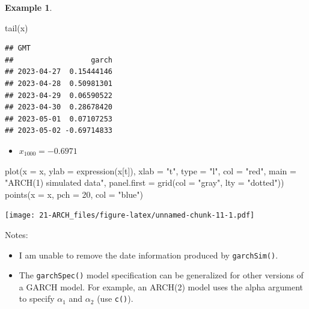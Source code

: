 \documentclass[
]{book}
\newenvironment{Shaded}{\begin{snugshade}}{\end{snugshade}}
\newcommand{\AttributeTok}[1]{\textcolor[rgb]{0.77,0.63,0.00}{#1}}
\newcommand{\DecValTok}[1]{\textcolor[rgb]{0.00,0.00,0.81}{#1}}
\newcommand{\FunctionTok}[1]{\textcolor[rgb]{0.00,0.00,0.00}{#1}}
\newcommand{\NormalTok}[1]{#1}
\newcommand{\StringTok}[1]{\textcolor[rgb]{0.31,0.60,0.02}{#1}}
\providecommand{\tightlist}{%
  \setlength{\itemsep}{0pt}\setlength{\parskip}{0pt}}
\theoremstyle{definition}
\theoremstyle{definition}
\newtheorem{example}{Example}[chapter]
\theoremstyle{definition}
\theoremstyle{definition}
\theoremstyle{remark}
\begin{document}
\begin{example}
\begin{Shaded}
\begin{Highlighting}[]
\FunctionTok{tail}\NormalTok{(x)}
\end{Highlighting}
\end{Shaded}

\begin{verbatim}
## GMT
##                  garch
## 2023-04-27  0.15444146
## 2023-04-28  0.50981301
## 2023-04-29  0.06590522
## 2023-04-30  0.28678420
## 2023-05-01  0.07107253
## 2023-05-02 -0.69714833
\end{verbatim}

\begin{itemize}
\tightlist
\item
  \(x_{1000}=-0.6971\)
\end{itemize}

\begin{Shaded}
\begin{Highlighting}[]
\FunctionTok{plot}\NormalTok{(}\AttributeTok{x =}\NormalTok{ x, }\AttributeTok{ylab =} \FunctionTok{expression}\NormalTok{(x[t]), }\AttributeTok{xlab =} \StringTok{"t"}\NormalTok{, }\AttributeTok{type =} 
    \StringTok{"l"}\NormalTok{, }\AttributeTok{col =} \StringTok{"red"}\NormalTok{, }\AttributeTok{main =} \StringTok{"ARCH(1) simulated data"}\NormalTok{, }
    \AttributeTok{panel.first =} \FunctionTok{grid}\NormalTok{(}\AttributeTok{col =} \StringTok{"gray"}\NormalTok{, }\AttributeTok{lty =} \StringTok{"dotted"}\NormalTok{))}
\FunctionTok{points}\NormalTok{(}\AttributeTok{x =}\NormalTok{ x, }\AttributeTok{pch =} \DecValTok{20}\NormalTok{, }\AttributeTok{col =} \StringTok{"blue"}\NormalTok{)}
\end{Highlighting}
\end{Shaded}

\texttt{[image: 21-ARCH\_files/figure-latex/unnamed-chunk-11-1.pdf]}

Notes:

\begin{itemize}
\tightlist
\item
  I am unable to remove the date information produced by \texttt{garchSim()}.
\item
  The \texttt{garchSpec()} model specification can be generalized for other versions of a GARCH model. For example, an ARCH(2) model uses the alpha argument to specify \(\alpha_1\) and \(\alpha_2\) (use \texttt{c()}).
\end{itemize}

\end{example}
\end{document}
